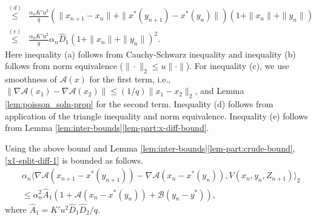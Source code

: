 \documentclass[letterpaper, 10 pt, conference]{ieeeconf}  %
\theoremstyle{definition}
\theoremstyle{plain}
\newcommand{\xstar}{x^*}
\newcommand{\hA}{\hat{A}}
\newcommand{\hD}{\hat{D}}
\newcommand{\Acal}{\mathcal{A}}
\newcommand{\Bcal}{\mathcal{B}}
\begin{document}
\begin{itemize}
\begin{itemize}
\begin{align*}
    \stackrel{(d)}{\leq}  &\frac{\alpha_nK'u^2}{q}(\|x_{n+1}-x_n\|+\|\xstar(y_{n+1})-\xstar(y_n)\|)(1+\|x_n\|+\|y_n\|)\\
    \stackrel{(e)}{\leq} &\frac{\alpha_nK'u^2}{q}\alpha_n\hD_1(1+\|x_n\|+\|y_n\|)^2.
\end{align*}
Here inequality (a) follows from Cauchy-Schwarz inequality and inequality (b) follows from norm equivalence ($\|\cdot\|_2\leq u\|\cdot\|$). For inequality (c), we use smoothness of $\Acal(x)$ for the first term, i.e., $\|\nabla \Acal(x_1)-\nabla \Acal(x_2)\|\leq (1/q)\|x_1-x_2\|_2$, and Lemma \ref{lem:poisson_soln-prop} for the second term. Inequality (d) follows from application of the triangle inequality and norm equivalence. Inequality (e) follows from Lemma \ref{lem:inter-bounds}\ref{lem-part:x-diff-bound}. 

Using the above bound and Lemma \ref{lem:inter-bounds}\ref{lem-part:crude-bound}, \eqref{x1-split-diff-1} is bounded as follows.
\begin{align}\label{x1-split-diff-soln-1}
    &\alpha_n\langle\nabla \Acal(x_{n+1}-\xstar(y_{n+1}))-\nabla \Acal(x_n-\xstar(y_n)), V(x_n,y_n,Z_{n+1})\rangle_2\nonumber\\
    &\leq \alpha_n^2\hA_1(1+\Acal(x_n-x^*(y_n))+\Bcal(y_n-y^*)),
\end{align}
where $\hA_1=K'u^2\hD_1\hD_2/q$.


\end{itemize}
\end{itemize}
\end{document}
